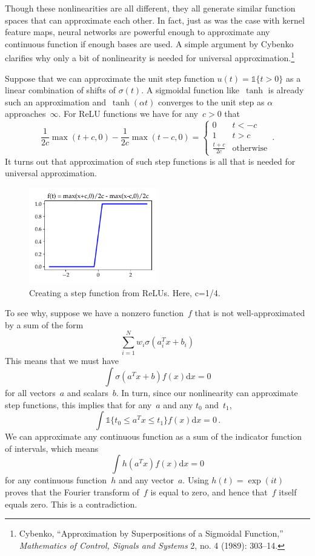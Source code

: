 \documentclass{tufte-book}
\begin{document}
Though these nonlinearities are all different, they all generate similar
function spaces that can approximate each other. In fact, just as was
the case with kernel feature maps, neural networks are powerful enough
to approximate any continuous function if enough bases are used. A
simple argument by Cybenko clarifies why only a bit of nonlinearity is
needed for universal
approximation.\footnote{Cybenko, {``Approximation by Superpositions of a
  Sigmoidal Function,''} \emph{Mathematics of Control, Signals and
  Systems} 2, no. 4 (1989): 303--14.}

Suppose that we can approximate the unit step function
\(u(t) = \mathbb{1}\{t>0\}\) as a linear combination of shifts of
\(\sigma(t)\). A sigmoidal function like~\(\tanh\) is already such an
approximation and~\(\tanh(\alpha t)\) converges to the unit step as
\(\alpha\) approaches~\(\infty\). For ReLU functions we have for
any~\(c>0\) that \[
    \frac{1}{2c} \max(t+c,0) - \frac{1}{2c} \max(t-c,0) =
    \begin{cases}
        0 & t<-c\\
        1 & t>c\\
        \frac{t+c}{2c} & \text{otherwise}
    \end{cases}\,.
\] It turns out that approximation of such step functions is all that is
needed for universal approximation.

\begin{figure}
\centering
\includegraphics[width=0.5\textwidth,height=\textheight]{assets/relu2step}
\caption{Creating a step function from ReLUs. Here, c=1/4.}
\end{figure}

To see why, suppose we have a nonzero function~\(f\) that is not
well-approximated by a sum of the form \[
    \sum_{i=1}^N w_i \sigma(a_i^Tx +b_i)
\] This means that we must have \[
    \int \sigma(a^Tx +b) f(x) \mathrm{d} x =0
\] for all vectors~\(a\) and scalars~\(b\). In turn, since our
nonlinearity can approximate step functions, this implies that for
any~\(a\) and any \(t_0\) and~\(t_1\), \[
    \int \mathbb{1}\{t_0 \leq a^Tx \leq t_1\} f(x) \mathrm{d} x = 0\,.
\] We can approximate any continuous function as a sum of the indicator
function of intervals, which means \[
    \int h(a^T x) f(x) \mathrm{d} x = 0
\] for any continuous function~\(h\) and any vector~\(a\). Using
\(h(t)=\exp(it)\) proves that the Fourier transform of~\(f\) is equal to
zero, and hence that~\(f\) itself equals zero. This is a contradiction.
\end{document}

